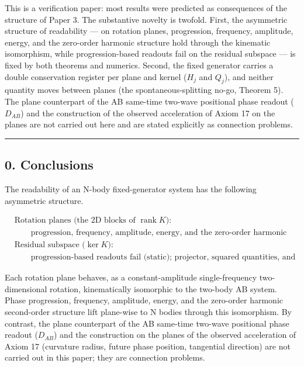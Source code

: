 \documentclass[
  a4paper,
]{article}
\begin{document}
This is a verification paper: most results were predicted as
consequences of the structure of Paper 3. The substantive novelty is
twofold. First, the asymmetric structure of readability --- on rotation
planes, progression, frequency, amplitude, energy, and the zero-order
harmonic structure hold through the kinematic isomorphism, while
progression-based readouts fail on the residual subspace --- is fixed by
both theorems and numerics. Second, the fixed generator carries a double
conservation register per plane and kernel (\(H_j\) and \(Q_j\)), and
neither quantity moves between planes (the spontaneous-splitting no-go,
Theorem 5). The plane counterpart of the AB same-time two-wave
positional phase readout (\(D_{AB}\)) and the construction of the
observed acceleration of Axiom 17 on the planes are not carried out here
and are stated explicitly as connection problems.

\begin{center}\rule{0.5\linewidth}{0.5pt}\end{center}

\subsection{0. Conclusions}\label{conclusions}

The readability of an N-body fixed-generator system has the following
asymmetric structure.

\[
\boxed{
\begin{aligned}
&\text{Rotation planes (the 2D blocks of }\operatorname{rank}K\text{):}\\
&\qquad\text{progression, frequency, amplitude, energy, and the zero-order harmonic structure all hold (AB kinematic isomorphism).}\\
&\text{Residual subspace (}\ker K\text{):}\\
&\qquad\text{progression-based readouts fail (static); projector, squared quantities, and state projection are covariantly defined.}
\end{aligned}
}
\]

Each rotation plane behaves, as a constant-amplitude single-frequency
two-dimensional rotation, kinematically isomorphic to the two-body AB
system. Phase progression, frequency, amplitude, energy, and the
zero-order harmonic second-order structure lift plane-wise to N bodies
through this isomorphism. By contrast, the plane counterpart of the AB
same-time two-wave positional phase readout (\(D_{AB}\)) and the
construction on the planes of the observed acceleration of Axiom 17
(curvature radius, future phase position, tangential direction) are not
carried out in this paper; they are connection problems.
\end{document}
